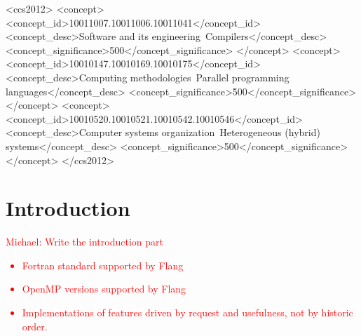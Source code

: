 \documentclass[acmtog,natbib=false]{acmart}
\newcommand{\todo}[1]{\textcolor{red}{#1}}
\begin{document}
\begin{CCSXML}
<ccs2012>
   <concept>
       <concept_id>10011007.10011006.10011041</concept_id>
       <concept_desc>Software and its engineering~Compilers</concept_desc>
       <concept_significance>500</concept_significance>
       </concept>
   <concept>
       <concept_id>10010147.10010169.10010175</concept_id>
       <concept_desc>Computing methodologies~Parallel programming languages</concept_desc>
       <concept_significance>500</concept_significance>
       </concept>
   <concept>
       <concept_id>10010520.10010521.10010542.10010546</concept_id>
       <concept_desc>Computer systems organization~Heterogeneous (hybrid) systems</concept_desc>
       <concept_significance>500</concept_significance>
       </concept>
 </ccs2012>
\end{CCSXML}



\maketitle


\section{Introduction}
\label{sec:Introduction}
\todo{Michael: Write the introduction part}

\todo{
\begin{itemize}
\item Fortran standard supported by Flang
\item OpenMP versions supported by Flang
\item Implementations of features driven by request and usefulness, not by historic order.
\end{itemize}
}

\end{document}
